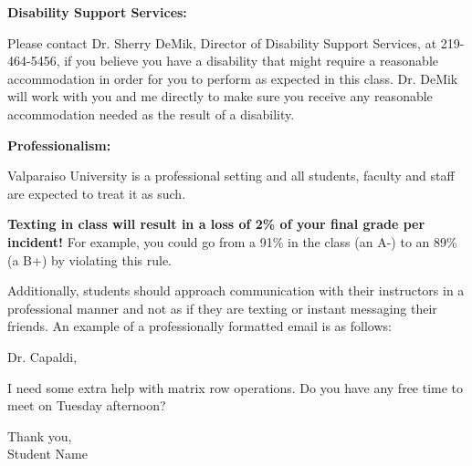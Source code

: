 \documentclass{article}
\theoremstyle{plain}
\theoremstyle{definition}
\theoremstyle{remark}
\begin{document}
\vskip0.2in \noindent
\begin{minipage}[t]{1.3in}
\textbf{Disability Support Services:} 
\end{minipage}
\begin{minipage}[t]{5.2in}

Please contact Dr.  Sherry DeMik, Director of Disability Support Services, at 219-464-5456, if you believe you have a disability that might require a reasonable accommodation in order for you to perform as expected in this class.  Dr. DeMik will work with you and me directly to make sure you receive any reasonable accommodation needed as the result of a disability.

\end{minipage}

\vskip0.2in \noindent
\begin{minipage}[t]{1.3in}
\textbf{Professionalism:} 
\end{minipage}
\begin{minipage}[t]{5.2in}
Valparaiso University is a professional setting and all students, faculty and staff are expected to treat it as such.

\vspace{0.2in}
\textbf{Texting in class will result in a loss of 2\% of your final grade per incident!}  For example, you could go from a 91\% in the class (an A-) to an 89\% (a B+) by violating this rule.

\vspace{0.2in}

Additionally, students should approach communication with their instructors in a professional manner and not as if they are texting or instant messaging their friends.  An example of a professionally formatted email is as follows:
\vspace{.2in}

Dr. Capaldi,\\

\vspace{.2in}

I need some extra help with matrix row operations.  Do you have any free time to meet on Tuesday afternoon?\\

\vspace{.2in}

Thank you,\\
Student Name

\end{minipage}
\end{document}
